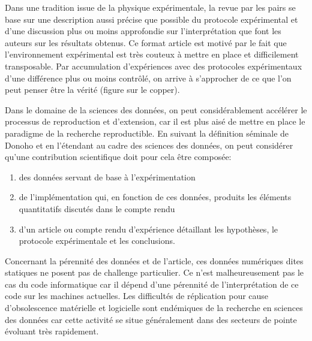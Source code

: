 Dans une tradition issue de la physique expérimentale, la revue par les pairs se base sur une description aussi précise que possible du protocole expérimental et d'une discussion plus ou moins approfondie sur l'interprétation que font les auteurs sur les résultats obtenus. Ce format \og article \fg est motivé par le fait que l'environnement expérimental est très couteux à mettre en place et difficilement transposable. Par accumulation d'expériences avec des protocoles expérimentaux d'une différence plus ou moins contrôlé, on arrive à s'approcher de ce que l'on peut penser être la vérité (figure sur le copper).

Dans le domaine de la sciences des données, on peut considérablement accélérer le processus de reproduction et d'extension, car il est plus aisé de mettre en place le paradigme de la recherche reproductible. En suivant la définition séminale de Donoho et en l'étendant au cadre des sciences des données, on peut considérer qu'une contribution scientifique doit pour cela être composée:
\begin{enumerate}
  \item des données servant de base à l'expérimentation
  \item de l'implémentation qui, en fonction de ces données, produits les éléments quantitatifs discutés dans le compte rendu
  \item d'un article ou compte rendu d'expérience détaillant les hypothèses, le protocole expérimentale et les conclusions.
\end{enumerate}

Concernant la pérennité des données et de l'article, ces données numériques dites \og statiques \fg ne posent pas de challenge particulier. Ce n'est malheureusement pas le cas du code informatique car il dépend d'une pérennité de l'interprétation de ce code sur les machines actuelles. Les difficultés de réplication pour cause d'obsolescence matérielle et logicielle sont endémiques de la recherche en sciences des données car cette activité se situe généralement dans des secteurs de pointe évoluant très rapidement.

